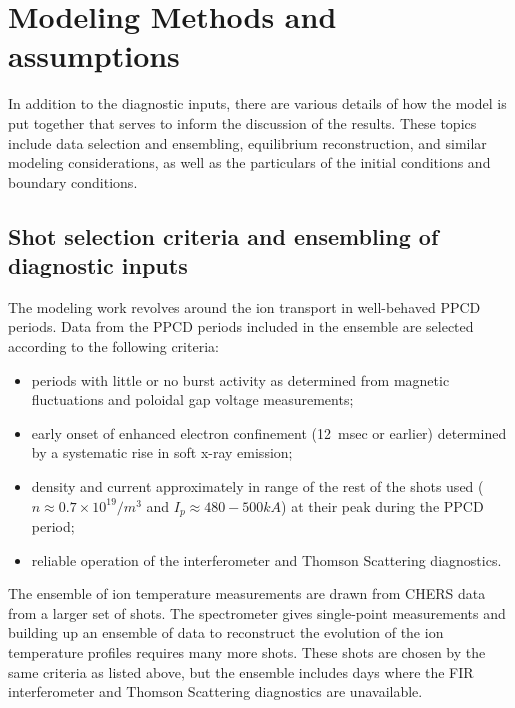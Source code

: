 \section{Modeling Methods and assumptions}
In addition to the diagnostic inputs, there are various details of how the model is put together that serves to inform the discussion of the results. These topics include data selection and ensembling, equilibrium reconstruction, and similar modeling considerations, as well as the particulars of the initial conditions and boundary conditions. 

\subsection{Shot selection criteria and ensembling of diagnostic inputs}

The modeling work revolves around the ion transport in well-behaved PPCD periods. Data from the PPCD periods included in the ensemble are selected according to the following criteria:
\begin{itemize}
\item periods with little or no burst activity as determined from magnetic fluctuations and poloidal gap voltage measurements; 
\item early onset of enhanced electron confinement (12~msec or earlier) determined by a systematic rise in soft x-ray emission;
\item density and current approximately in range of the rest of the shots used ($n \approx 0.7 \times 10^{19} /m^3$ and $I_p \approx 480 - 500kA $) at their peak during the PPCD period;
\item reliable operation of the interferometer and Thomson Scattering diagnostics.
\end{itemize}
The ensemble of ion temperature measurements are drawn from CHERS data from a larger set of shots. The spectrometer gives single-point measurements and building up an ensemble of data to reconstruct the evolution of the ion temperature profiles requires many more shots. These shots are chosen by the same criteria as listed above, but the ensemble includes days where the FIR interferometer and Thomson Scattering diagnostics are unavailable.


